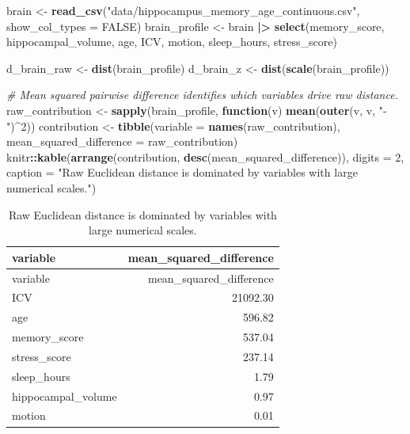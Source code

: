 \documentclass[
  english,
]{article}
\newenvironment{Shaded}{\begin{snugshade}}{\end{snugshade}}
\newcommand{\AttributeTok}[1]{\textcolor[rgb]{0.13,0.29,0.53}{#1}}
\newcommand{\CommentTok}[1]{\textcolor[rgb]{0.56,0.35,0.01}{\textit{#1}}}
\newcommand{\ConstantTok}[1]{\textcolor[rgb]{0.56,0.35,0.01}{#1}}
\newcommand{\ControlFlowTok}[1]{\textcolor[rgb]{0.13,0.29,0.53}{\textbf{#1}}}
\newcommand{\DecValTok}[1]{\textcolor[rgb]{0.00,0.00,0.81}{#1}}
\newcommand{\FunctionTok}[1]{\textcolor[rgb]{0.13,0.29,0.53}{\textbf{#1}}}
\newcommand{\NormalTok}[1]{#1}
\newcommand{\OtherTok}[1]{\textcolor[rgb]{0.56,0.35,0.01}{#1}}
\newcommand{\SpecialCharTok}[1]{\textcolor[rgb]{0.81,0.36,0.00}{\textbf{#1}}}
\newcommand{\StringTok}[1]{\textcolor[rgb]{0.31,0.60,0.02}{#1}}
\begin{document}
\begin{Shaded}
\begin{Highlighting}[]
\NormalTok{brain }\OtherTok{\textless{}{-}} \FunctionTok{read\_csv}\NormalTok{(}\StringTok{"data/hippocampus\_memory\_age\_continuous.csv"}\NormalTok{, }\AttributeTok{show\_col\_types =} \ConstantTok{FALSE}\NormalTok{)}
\NormalTok{brain\_profile }\OtherTok{\textless{}{-}}\NormalTok{ brain }\SpecialCharTok{|\textgreater{}} \FunctionTok{select}\NormalTok{(memory\_score, hippocampal\_volume, age, ICV,}
\NormalTok{                                 motion, sleep\_hours, stress\_score)}

\NormalTok{d\_brain\_raw }\OtherTok{\textless{}{-}} \FunctionTok{dist}\NormalTok{(brain\_profile)}
\NormalTok{d\_brain\_z }\OtherTok{\textless{}{-}} \FunctionTok{dist}\NormalTok{(}\FunctionTok{scale}\NormalTok{(brain\_profile))}

\CommentTok{\# Mean squared pairwise difference identifies which variables drive raw distance.}
\NormalTok{raw\_contribution }\OtherTok{\textless{}{-}} \FunctionTok{sapply}\NormalTok{(brain\_profile, }\ControlFlowTok{function}\NormalTok{(v) }\FunctionTok{mean}\NormalTok{(}\FunctionTok{outer}\NormalTok{(v, v, }\StringTok{"{-}"}\NormalTok{)}\SpecialCharTok{\^{}}\DecValTok{2}\NormalTok{))}
\NormalTok{contribution }\OtherTok{\textless{}{-}} \FunctionTok{tibble}\NormalTok{(}\AttributeTok{variable =} \FunctionTok{names}\NormalTok{(raw\_contribution), }\AttributeTok{mean\_squared\_difference =}\NormalTok{ raw\_contribution)}
\NormalTok{knitr}\SpecialCharTok{::}\FunctionTok{kable}\NormalTok{(}\FunctionTok{arrange}\NormalTok{(contribution, }\FunctionTok{desc}\NormalTok{(mean\_squared\_difference)), }\AttributeTok{digits =} \DecValTok{2}\NormalTok{,}
             \AttributeTok{caption =} \StringTok{"Raw Euclidean distance is dominated by variables with large numerical scales."}\NormalTok{)}
\end{Highlighting}
\end{Shaded}

\begin{longtable}[]{@{}lr@{}}
\caption{Raw Euclidean distance is dominated by variables with large
numerical scales.}\tabularnewline
\toprule\noalign{}
variable & mean\_squared\_difference \\
\midrule\noalign{}
\endfirsthead
\toprule\noalign{}
variable & mean\_squared\_difference \\
\midrule\noalign{}
\endhead
\bottomrule\noalign{}
\endlastfoot
ICV & 21092.30 \\
age & 596.82 \\
memory\_score & 537.04 \\
stress\_score & 237.14 \\
sleep\_hours & 1.79 \\
hippocampal\_volume & 0.97 \\
motion & 0.01 \\
\end{longtable}
\end{document}
